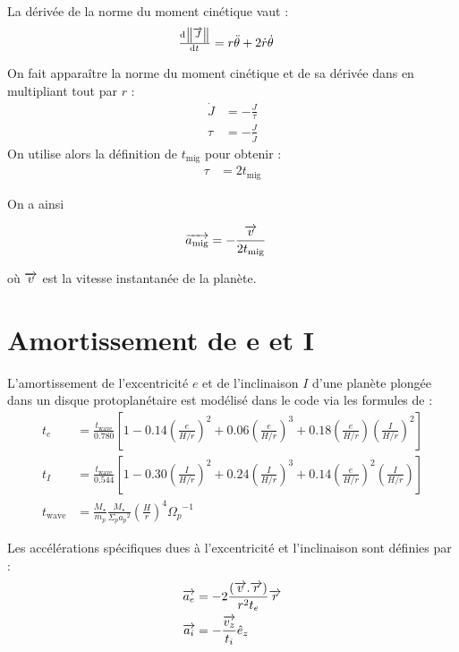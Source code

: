 La dérivée de la norme du moment cinétique vaut :
\begin{align*}
\od{\norm{\vect{J}}}{t} &= r\ddot{\theta} + 2 \dot{r}\dot{\theta}
\end{align*}

On fait apparaître la norme du moment cinétique et de sa dérivée dans  en multipliant tout par $r$ : 
\begin{align*}
\dot{J} &= - \frac{J}{\tau}\nonumber\\
\tau &= - \frac{J}{\dot{J}}
\end{align*}
On utilise alors la définition de $t_\text{mig}$ pour obtenir :
\begin{align*}
\tau &= 2 t_\text{mig}
\end{align*}

On a ainsi
\begin{important}
\begin{align}
{\overrightarrow{a_\text{mig}}} &= -\frac{{\overrightarrow{v}}}{2 t_\text{mig}}
\end{align}
\end{important}
où ${\overrightarrow{v}}$ est la vitesse instantanée de la planète.

\section{Amortissement de e et I}
L'amortissement de l'excentricité $e$ et de l'inclinaison $I$ d'une planète plongée dans un disque protoplanétaire est modélisé
dans le code via les formules de \cite[eq. (9), (11) et (12)]{cresswell2008three} : 
\begin{subequations}
\begin{align}
t_e &= \frac{t_\text{wave}}{0.780}\left[1-0.14\left(\frac{e}{H/r}\right)^2 + 0.06 \left(\frac{e}{H/r}\right)^3 + 0.18\left(\frac{e}{H/r}\right)\left(\frac{I}{H/r}\right)^2\right]\\
t_I &= \frac{t_\text{wave}}{0.544}\left[1-0.30\left(\frac{I}{H/r}\right)^2 + 0.24 \left(\frac{I}{H/r}\right)^3 + 0.14\left(\frac{e}{H/r}\right)^2\left(\frac{I}{H/r}\right)\right]\\
t_\text{wave} &= \frac{M_\star}{m_p}\frac{M_\star}{\Sigma_p {a_p}^2}\left(\frac{H}{r}\right)^4{\Omega_p}^{-1}
\end{align}
\end{subequations}

Les accélérations spécifiques dues à l'excentricité  et l'inclinaison sont définies par \citep[eq. (15) et (16)]{cresswell2008three} : 
\begin{subequations}
\begin{align}
{\overrightarrow{a_e}} &= -2 \frac{({\overrightarrow{v}}.{\overrightarrow{r}})}{r^2 t_e}{\overrightarrow{r}}\\
{\overrightarrow{a_i}} &= - \frac{{\overrightarrow{v_z}}}{t_i}\hat{e}_z
\end{align}
\end{subequations}

